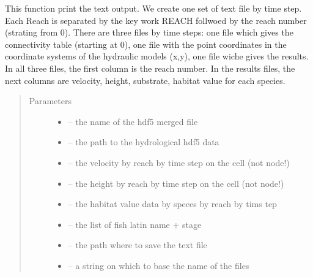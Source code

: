 \documentclass[letterpaper,10pt,english]{sphinxmanual}
\begin{document}

\begin{fulllineitems}
\label{\detokenize{index:src.calcul_hab.save_hab_txt}}
This function print the text output. We create one set of text file by time step. Each Reach is separated by the
key work REACH follwoed by the reach number (strating from 0). There are three files by time steps: one file which
gives the connectivity table (starting at 0), one file with the point coordinates in the
coordinate systems of the hydraulic models (x,y), one file wiche gives the results.
In all three files, the first column is the reach number. In the results files, the next columns are velocity,
height, substrate, habitat value for each species.
\begin{quote}\begin{description}
\item[{Parameters}] \leavevmode\begin{itemize}
\item {} 
 -- the name of the hdf5 merged file

\item {} 
 -- the path to the hydrological hdf5 data

\item {} 
 -- the velocity by reach by time step on the cell (not node!)

\item {} 
 -- the height by reach by time step on the cell (not node!)

\item {} 
 -- the habitat value data by speces by reach by tims tep

\item {} 
 -- the list of fish latin name + stage

\item {} 
 -- the path where to save the text file

\item {} 
 -- a string on which to base the name of the files

\end{itemize}

\end{description}\end{quote}

\end{fulllineitems}
\end{document}
